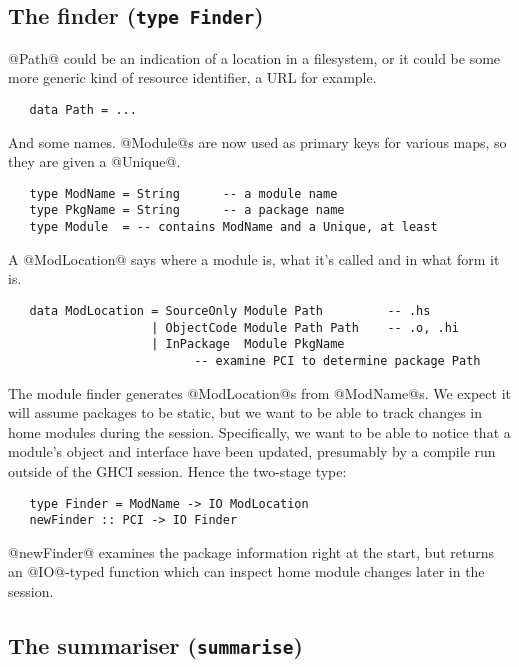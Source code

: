 \documentclass[11pt]{article}
\begin{document}
\subsection{The finder (\mbox{\tt type Finder})}
\label{sec:finder}

@Path@ could be an indication of a location in a filesystem, or it
could be some more generic kind of resource identifier, a URL for
example.
\begin{verbatim}
   data Path = ...
\end{verbatim}

And some names.  @Module@s are now used as primary keys for various
maps, so they are given a @Unique@.
\begin{verbatim}
   type ModName = String      -- a module name
   type PkgName = String      -- a package name
   type Module  = -- contains ModName and a Unique, at least
\end{verbatim}

A @ModLocation@ says where a module is, what it's called and in what
form it is.
\begin{verbatim}
   data ModLocation = SourceOnly Module Path         -- .hs
                    | ObjectCode Module Path Path    -- .o, .hi
                    | InPackage  Module PkgName
                          -- examine PCI to determine package Path
\end{verbatim}

The module finder generates @ModLocation@s from @ModName@s.  We expect
it will assume packages to be static, but we want to be able to track
changes in home modules during the session.  Specifically, we want to
be able to notice that a module's object and interface have been
updated, presumably by a compile run outside of the GHCI session.
Hence the two-stage type:
\begin{verbatim}
   type Finder = ModName -> IO ModLocation
   newFinder :: PCI -> IO Finder
\end{verbatim}
@newFinder@ examines the package information right at the start, but 
returns an @IO@-typed function which can inspect home module changes
later in the session.


\subsection{The summariser (\mbox{\tt summarise})}
\label{sec:summariser}
\end{document}
